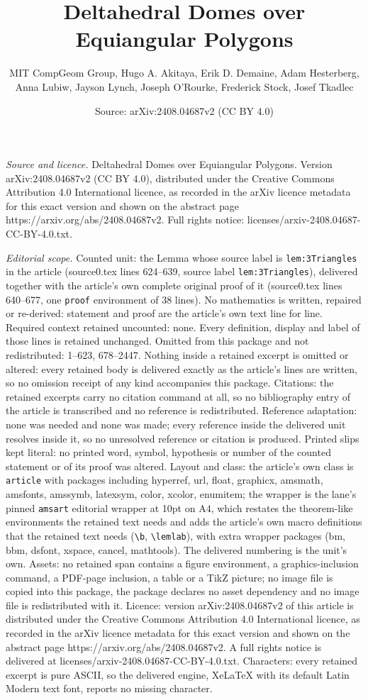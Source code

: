 \documentclass[10pt,a4paper]{amsart}
\title[Deltahedral Domes over Equiangular Polygons]{Deltahedral Domes over Equiangular Polygons}
\author{MIT CompGeom Group, Hugo A. Akitaya, Erik D. Demaine, Adam Hesterberg, Anna Lubiw, Jayson Lynch, Joseph O'Rourke, Frederick Stock, Josef Tkadlec}
\date{Source: arXiv:2408.04687v2 (CC BY 4.0)}
\begin{document}
\maketitle

\noindent\emph{Source and licence.} Deltahedral Domes over Equiangular Polygons. Version arXiv:2408.04687v2 (CC BY 4.0), distributed under the Creative Commons Attribution 4.0 International licence, as recorded in the arXiv licence metadata for this exact version and shown on the abstract page https://arxiv.org/abs/2408.04687v2. Full rights notice: licenses/arxiv-2408.04687-CC-BY-4.0.txt.\par\smallskip

\noindent\textit{Editorial scope.} Counted unit: the Lemma whose source label is \texttt{lem:3Triangles} in the article (source0.tex lines 624--639, source label \texttt{lem:3Triangles}), delivered together with the article's own complete original proof of it (source0.tex lines 640--677, one \texttt{proof} environment of 38 lines). No mathematics is written, repaired or re-derived: statement and proof are the article's own text line for line. Required context retained uncounted: none. Every definition, display and label of those lines is retained unchanged. Omitted from this package and not redistributed: 1--623, 678--2447. Nothing inside a retained excerpt is omitted or altered: every retained body is delivered exactly as the article's lines are written, so no omission receipt of any kind accompanies this package. Citations: the retained excerpts carry no citation command at all, so no bibliography entry of the article is transcribed and no reference is redistributed. Reference adaptation: none was needed and none was made; every reference inside the delivered unit resolves inside it, so no unresolved reference or citation is produced. Printed slips kept literal: no printed word, symbol, hypothesis or number of the counted statement or of its proof was altered. Layout and class: the article's own class is \texttt{article} with packages including hyperref, url, float, graphicx, amsmath, amsfonts, amssymb, latexsym, color, xcolor, enumitem; the wrapper is the lane's pinned \texttt{amsart} editorial wrapper at 10pt on A4, which restates the theorem-like environments the retained text needs and adds the article's own macro definitions that the retained text needs (\texttt{\textbackslash b}, \texttt{\textbackslash lemlab}), with extra wrapper packages (bm, bbm, dsfont, xspace, cancel, mathtools). The delivered numbering is the unit's own. Assets: no retained span contains a figure environment, a graphics-inclusion command, a PDF-page inclusion, a table or a TikZ picture; no image file is copied into this package, the package declares no asset dependency and no image file is redistributed with it. Licence: version arXiv:2408.04687v2 of this article is distributed under the Creative Commons Attribution 4.0 International licence, as recorded in the arXiv licence metadata for this exact version and shown on the abstract page https://arxiv.org/abs/2408.04687v2. A full rights notice is delivered at licenses/arxiv-2408.04687-CC-BY-4.0.txt. Characters: every retained excerpt is pure ASCII, so the delivered engine, XeLaTeX with its default Latin Modern text font, reports no missing character.
\end{document}
